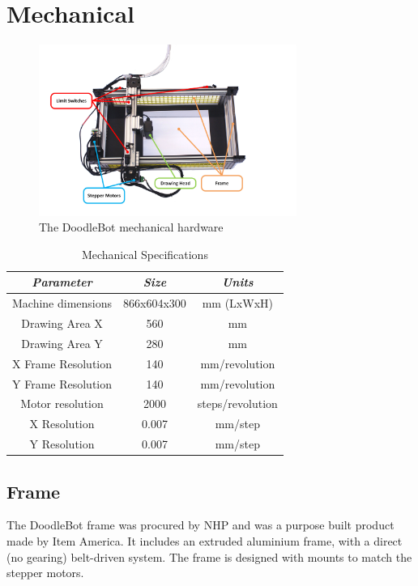 \section{Mechanical}
\label{sec:implementation-mechanical}

\begin{figure}[h]
	\centering
	\includegraphics[trim=10mm 0mm 40mm 28mm, clip, width=0.75\textwidth]{figures/cncMachine/mechanical.jpg}
	\caption{The DoodleBot mechanical hardware}
	\label{fig:implementation-mechanical}
\end{figure}

\begin{table}
	\centering
	\begin{tabular}{|c|c|c|}
		\hline
		\emph{Parameter} & \emph{Size} & \emph{Units}\\ \hline
		Machine dimensions & 866x604x300 & mm (LxWxH)\\ \hline
		Drawing Area X & 560 & mm\\ \hline
		Drawing Area Y & 280 & mm\\ \hline
		X Frame Resolution & 140 & mm/revolution\\ \hline
		Y Frame Resolution & 140 & mm/revolution\\ \hline
		Motor resolution & 2000 & steps/revolution\\ \hline
		X Resolution & 0.007 & mm/step\\ \hline 
		Y Resolution & 0.007 & mm/step\\ \hline
	\end{tabular}
	\caption{Mechanical Specifications}
\end{table}

\subsection{Frame}
	The DoodleBot frame was procured by NHP and was a purpose built product made by Item America. It includes an extruded aluminium frame, with a direct (no gearing) belt-driven system. The frame is designed with mounts to match the stepper motors. 
